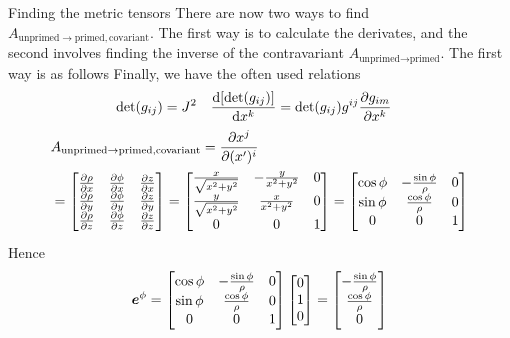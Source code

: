 \documentclass[a4paper, 12pt]{article}
\renewcommand{\arraystretch}{0.8}
\begin{document}
\begin{example}{Finding the metric tensors}
 There are now two ways to find $A_{\text{unprimed}\to \text{primed},
 \text{covariant}}$. The first way is to calculate the derivates, and the
 second involves finding the inverse of the contravariant $A_{\text{unprimed}\to
 \text{primed}}$. The first way is as follows
 Finally, we have the often used relations
%
\begin{align*}
 &\det(g_{ij}) = J^2&
 &\frac{\text{d}{[\det(g_{ij})]}}{\text{d}{x^k}} = \det(g_{ij})g^{ij}\frac{\partial {g_{im}}}{\partial{x^k}}
\end{align*}
 \renewcommand\arraystretch{2}
 \begin{align*}
  &A_{\text{unprimed}\to \text{primed}, \text{covariant}} =
  \frac{\partial {x^j}}{\partial{(x')^i}}\\
  &=
  \begin{bmatrix}
   \frac{\partial {\rho}}{\partial{x}} & \frac{\partial {\phi}}{\partial{x}} & \frac{\partial {z}}{\partial{x}}\\
   \frac{\partial {\rho}}{\partial{y}} & \frac{\partial {\phi}}{\partial{y}} & \frac{\partial {z}}{\partial{y}}\\
   \frac{\partial {\rho}}{\partial{z}} & \frac{\partial {\phi}}{\partial{z}} & \frac{\partial {z}}{\partial{z}}
  \end{bmatrix}
  =
  \begin{bmatrix}
   \frac{x}{\sqrt{x^2+y^2}} & -\frac{y}{x^2+y^2} & 0\\
   \frac{y}{\sqrt{x^2+y^2}} & \frac{x}{x^2+y^2} & 0\\
   0 & 0 & 1
  \end{bmatrix}
  =
  \begin{bmatrix}
   \cos\phi & -\frac{\sin\phi}{\rho} & 0\\
   \sin\phi & \frac{\cos\phi}{\rho} & 0\\
   0 & 0 & 1
  \end{bmatrix}
 \end{align*}
 Hence
 \renewcommand\arraystretch{1}
 \begin{align*}
  \ve{e}^{\phi} =
  \begin{bmatrix}
   \cos\phi & -\frac{\sin\phi}{\rho} & 0\\
   \sin\phi & \frac{\cos\phi}{\rho} & 0\\
   0 & 0 & 1
  \end{bmatrix}
  \begin{bmatrix}
   0\\
   1\\
   0
  \end{bmatrix}
  =
  \begin{bmatrix}
   -\frac{\sin\phi}{\rho}\\
   \frac{\cos\phi}{\rho}\\
   0
  \end{bmatrix}

\end{align*}
\end{example}
\end{document}
